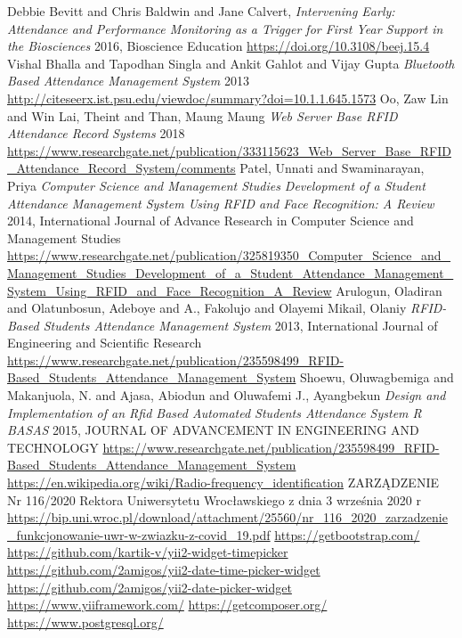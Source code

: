 \documentclass[declaration,shortabstract, mgr]{iithesis}
\begin{document}
\begin{thebibliography}{9}
		Debbie Bevitt and Chris Baldwin and Jane Calvert,
		\textit{Intervening Early: Attendance and Performance Monitoring as a Trigger for First Year Support in the Biosciences}
		2016, Bioscience Education
		\url{https://doi.org/10.3108/beej.15.4}
		Vishal Bhalla and Tapodhan Singla and Ankit Gahlot and Vijay Gupta
		\textit{Bluetooth Based Attendance Management System}
		2013
		\url{http://citeseerx.ist.psu.edu/viewdoc/summary?doi=10.1.1.645.1573}
		Oo, Zaw Lin and Win Lai, Theint and Than, Maung Maung
		\textit{Web Server Base RFID Attendance Record Systems}
		2018
		\url{https://www.researchgate.net/publication/333115623_Web_Server_Base_RFID_Attendance_Record_System/comments}
		Patel, Unnati and Swaminarayan, Priya
		\textit{Computer Science and Management Studies Development of a Student Attendance Management System Using RFID and Face Recognition: A Review}
		2014, International Journal of Advance Research in Computer Science and Management Studies
		\url{https://www.researchgate.net/publication/325819350_Computer_Science_and_Management_Studies_Development_of_a_Student_Attendance_Management_System_Using_RFID_and_Face_Recognition_A_Review}
		Arulogun, Oladiran and Olatunbosun, Adeboye and A., Fakolujo and Olayemi Mikail, Olaniy
		\textit{RFID-Based Students Attendance Management System}
		2013, International Journal of Engineering and Scientific Research
		\url{https://www.researchgate.net/publication/235598499_RFID-Based_Students_Attendance_Management_System}
		Shoewu, Oluwagbemiga and Makanjuola, N. and Ajasa, Abiodun and Oluwafemi J., Ayangbekun
		\textit{Design and Implementation of an Rfid Based Automated Students Attendance System R BASAS}
		2015, JOURNAL OF ADVANCEMENT IN ENGINEERING AND TECHNOLOGY
		\url{https://www.researchgate.net/publication/235598499_RFID-Based_Students_Attendance_Management_System}
		\url{https://en.wikipedia.org/wiki/Radio-frequency_identification}	
		ZARZĄDZENIE Nr 116/2020 Rektora Uniwersytetu Wrocławskiego z dnia 3 września 2020 r
		\url{https://bip.uni.wroc.pl/download/attachment/25560/nr_116_2020_zarzadzenie_funkcjonowanie-uwr-w-zwiazku-z-covid_19.pdf}
		\url{https://getbootstrap.com/}	
		\url{https://github.com/kartik-v/yii2-widget-timepicker}	
		\url{https://github.com/2amigos/yii2-date-time-picker-widget}	
		\url{https://github.com/2amigos/yii2-date-picker-widget}	
		\url{https://www.yiiframework.com/}
		\url{https://getcomposer.org/}	
		\url{https://www.postgresql.org/}	
\end{thebibliography}
\end{document}
